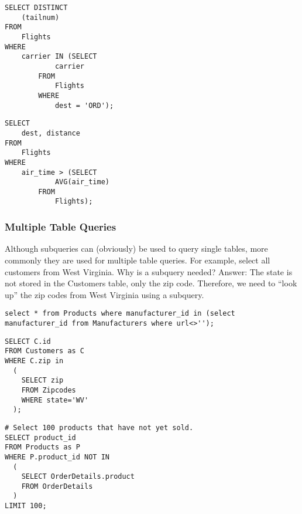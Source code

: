 \documentclass{article}
\begin{document}
 
 
 
 
 
 
 
 
 
 
  
  
  
\begin{lstlisting}[frame=single]  
SELECT DISTINCT
    (tailnum)
FROM
    Flights
WHERE
    carrier IN (SELECT 
            carrier
        FROM
            Flights
        WHERE
            dest = 'ORD');
\end{lstlisting}                

  
  
\begin{lstlisting}[frame=single]  
SELECT 
    dest, distance
FROM
    Flights
WHERE
    air_time > (SELECT 
            AVG(air_time)
        FROM
            Flights);
\end{lstlisting}                
  
  


  
  
  
  
\subsubsection*{Multiple Table Queries}  
  
 \noindent Although subqueries can (obviously) be used to query single tables, more commonly they are used for multiple table queries.  For example, select all customers from West Virginia.  Why is a subquery needed? Answer: The state is not stored in the Customers table, only the zip code.  Therefore, we need to ``look up'' the zip codes from West Virginia using a subquery. 
  
\begin{lstlisting}[frame=single]   
select * from Products where manufacturer_id in (select manufacturer_id from Manufacturers where url<>'');
\end{lstlisting}   
  
  
  
  
\begin{lstlisting}[frame=single]  
SELECT C.id 
FROM Customers as C 
WHERE C.zip in 
  (
    SELECT zip 
    FROM Zipcodes 
    WHERE state='WV'
  ); 
\end{lstlisting} 
  
  
  
  
\begin{lstlisting}[frame=single]    
# Select 100 products that have not yet sold.
SELECT product_id
FROM Products as P
WHERE P.product_id NOT IN 
  (
    SELECT OrderDetails.product 
    FROM OrderDetails
  )
LIMIT 100;
\end{lstlisting}   
  
\end{document}
